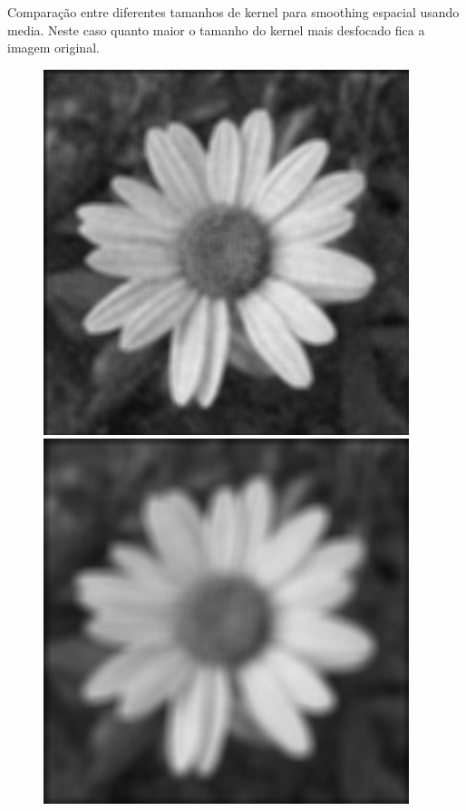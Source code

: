\documentclass[a4paper]{report}
\begin{document}
Comparação entre diferentes tamanhos de kernel para smoothing espacial usando media. Neste caso quanto maior o
tamanho do kernel mais desfocado fica a imagem original.
\begin{figure}[H]
\centering
\begin{minipage}{.3\textwidth}
  \centering
    \includegraphics[width=0.95\textwidth]{images/Smooth/spatial-gaussian/flower_smooth_spatial_average_5_0.8.png}
\end{minipage}%
\begin{minipage}{.3\textwidth}
  \centering
    \includegraphics[width=0.95\textwidth]{images/Smooth/spatial-gaussian/flower_smooth_spatial_average_10_0.8.png}

\end{minipage}
\end{figure}
\end{document}
